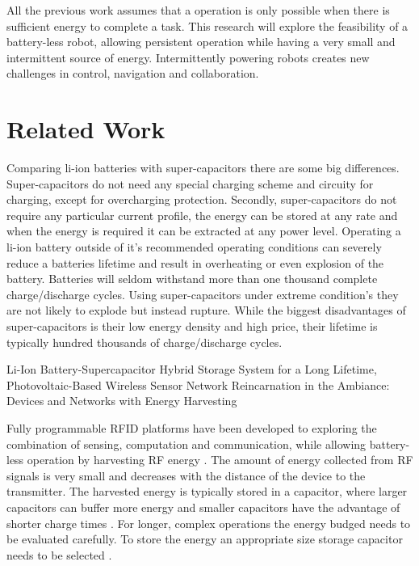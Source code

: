 \documentclass[letterpaper, 10 pt, conference]{ieeeconf}  %
\begin{document}
% 

All the previous work assumes that a operation is only possible when there is sufficient energy to complete a task. 
This research will explore the feasibility of a battery-less robot, allowing persistent operation while having a very small and intermittent source of energy.
Intermittently powering robots creates new challenges in control, navigation and collaboration.

\section{Related Work}


Comparing li-ion batteries with super-capacitors there are some big differences.
Super-capacitors do not need any special charging scheme and circuity for charging, except for overcharging protection.
Secondly, super-capacitors do not require any particular current profile, the energy can be stored at any rate and when the energy is required it can be extracted at any power level.
Operating a li-ion battery outside of it's recommended operating conditions can severely reduce a batteries lifetime and result in overheating or even explosion of the battery.
Batteries will seldom withstand more than one thousand complete charge/discharge cycles.
Using super-capacitors under extreme condition's they are not likely to explode but instead rupture.
While the biggest disadvantages of super-capacitors is their low energy density and high price, their lifetime is typically hundred thousands of charge/discharge cycles.

Li-Ion Battery-Supercapacitor Hybrid Storage System for a Long Lifetime, Photovoltaic-Based Wireless Sensor Network	\cite{ongaro_pwre_2012}
Reincarnation in the Ambiance: Devices and Networks with Energy Harvesting \cite{prasad_comst_2014}





Fully programmable RFID platforms have been developed to exploring the combination of sensing, computation and communication, while allowing battery-less operation by harvesting RF energy \cite{sample_transim_2008}.
The amount of energy collected from RF signals is very small and decreases with the distance of the device to the transmitter.
The harvested energy is typically stored in a capacitor, where larger capacitors can buffer more energy and smaller capacitors have the advantage of shorter charge times \cite{gummerson_mobisys_2010}.
For longer, complex operations the energy budged needs to be evaluated carefully.
To store the energy an appropriate size storage capacitor needs to be selected \cite{naderiparizi_rfid_2015}.
\end{document}
